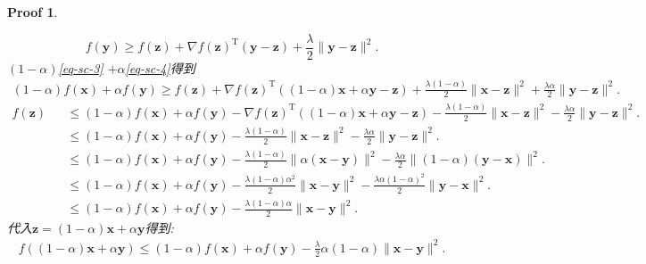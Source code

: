 \documentclass[a4paper,UTF8]{article}
\numberwithin{equation}{section}
\newtheorem*{myProof}{Proof}
\begin{document}
\begin{myProof}
\begin{enumerate}
\begin{equation}
  \label{eq-sc-4}
  f(\mathbf{y}) \geq f(\mathbf{z}) + \nabla f(\mathbf{z})^\mathrm{T}(\mathbf{y}-\mathbf{z}) + \frac{\lambda}{2}\lVert \mathbf{y} - \mathbf{z}\rVert^2.
\end{equation}
$(1-\alpha)$\ref{eq-sc-3} $+ \alpha$\ref{eq-sc-4}得到\\
\begin{eqnarray*}
  (1-\alpha)f(\mathbf{x})+\alpha f(\mathbf{y}) 
  \geq f(\mathbf{z}) 
  + \nabla f(\mathbf{z})^\mathrm{T}((1-\alpha)\mathbf{x}+\alpha\mathbf{y}-\mathbf{z}) 
  + \frac{\lambda(1-\alpha)}{2}\lVert \mathbf{x} - \mathbf{z}\rVert^2 
  + \frac{\lambda\alpha}{2}\lVert \mathbf{y} - \mathbf{z}\rVert^2.
\end{eqnarray*}
\begin{eqnarray*}
  f(\mathbf{z})
  &&\leq (1-\alpha)f(\mathbf{x})+\alpha f(\mathbf{y})
  - \nabla f(\mathbf{z})^\mathrm{T}((1-\alpha)\mathbf{x}+\alpha\mathbf{y}-\mathbf{z})
  - \frac{\lambda(1-\alpha)}{2}\lVert \mathbf{x}
  - \mathbf{z}\rVert^2 - \frac{\lambda\alpha}{2}\lVert \mathbf{y} - \mathbf{z}\rVert^2.\\
  &&\leq (1-\alpha)f(\mathbf{x})+\alpha f(\mathbf{y})
  - \frac{\lambda(1-\alpha)}{2}\lVert \mathbf{x}- \mathbf{z}\rVert^2 
  - \frac{\lambda\alpha}{2}\lVert \mathbf{y} - \mathbf{z}\rVert^2.\\
  &&\leq (1-\alpha)f(\mathbf{x})+\alpha f(\mathbf{y})
  - \frac{\lambda(1-\alpha)}{2}\lVert \alpha(\mathbf{x}- \mathbf{y})\rVert^2 
  - \frac{\lambda\alpha}{2}\lVert (1-\alpha)(\mathbf{y} - \mathbf{x})\rVert^2.\\
  &&\leq (1-\alpha)f(\mathbf{x})+\alpha f(\mathbf{y})
  - \frac{\lambda(1-\alpha)\alpha^2}{2}\lVert \mathbf{x}- \mathbf{y}\rVert^2 
  - \frac{\lambda\alpha (1-\alpha)^2}{2}\lVert \mathbf{y} - \mathbf{x} \rVert^2.\\
  &&\leq (1-\alpha)f(\mathbf{x})+\alpha f(\mathbf{y})
  - \frac{\lambda(1-\alpha)\alpha}{2}\lVert \mathbf{x}- \mathbf{y}\rVert^2.
\end{eqnarray*}
代入$\mathbf{z}=(1-\alpha)\mathbf{x}+\alpha \mathbf{y}$得到:\\
\begin{eqnarray*}
  f((1-\alpha)\mathbf{x} + \alpha\mathbf{y})\leq (1-\alpha)f(\mathbf{x}) + \alpha f(\mathbf{y}) - \frac{\lambda}{2}\alpha(1-\alpha)\lVert \mathbf{x} - \mathbf{y}\rVert^2.
\end{eqnarray*}


\end{enumerate}
\end{myProof}
\end{document}
